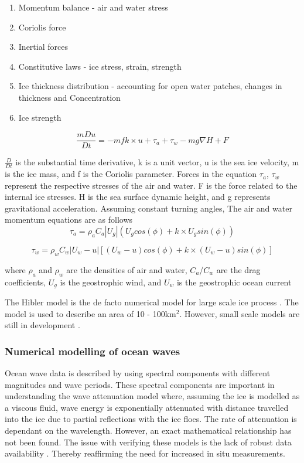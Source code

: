 \begin{enumerate}
	\item    Momentum balance  - air and water stress
	\item    Coriolis force
	\item    Inertial forces
	\item    Constitutive laws - ice stress, strain, strength
	\item    Ice thickness distribution - accounting for open water patches, changes in thickness and Concentration
	\item    Ice strength 
\end{enumerate}
\begin{equation}
	\frac{mDu}{Dt} = -mfk\times u +\tau_a +\tau_w -mg \nabla H +F 
\end{equation}

$\frac{D}{Dt}$ is the substantial time derivative, k is a unit vector, u is the sea ice velocity, m is the ice mass, and f is the Coriolis parameter. Forces in the equation $\tau_a$, $\tau_w$ represent the respective stresses of the air and water. F is the force related to the internal ice stresses. H is the sea surface dynamic height, and g represents gravitational acceleration. Assuming constant turning angles, The air and water momentum equations are as follows
\begin{equation}
	\tau_a = \rho_a C_a|U_g|(U_g cos(\phi)+k\times U_g sin(\phi))
\end{equation}

\begin{equation}
	\tau_w = \rho_w C_w|U_w-u|[(U_w-u)cos(\phi)+k\times(U_w-u)sin(\phi)]
\end{equation}


where $\rho_a $ and $\rho_w$ are the densities of air and water, $C_a$/$C_w$ are the drag coefficients, $U_g$ is the geostrophic wind, and $U_w$ is the geostrophic ocean current\par

The Hibler model is the de facto numerical model for large scale ice process \cite{Rutgher2019SmallScale}. The model is used to describe an area of 10 - 100km$^2$. However, small scale models are still in development \cite{Rutgher2019SmallScale}.\par 

\subsubsection{Numerical modelling of ocean waves}
Ocean wave data is described by using spectral components with different magnitudes and wave periods. These spectral components are important in understanding the wave attenuation model \cite{williams2013wave} where, assuming the ice is modelled as a viscous fluid, wave energy is exponentially attenuated \cite{meylan2014situ}\cite{williams2013wave} with distance travelled into the ice due to partial reflections with the ice floes. The rate of attenuation is dependant on the wavelength. However, an exact mathematical relationship has not been found. The issue with verifying these models is the lack of robust data availability \cite{meylan2014situ}. Thereby reaffirming the need for increased in situ measurements.\par 

